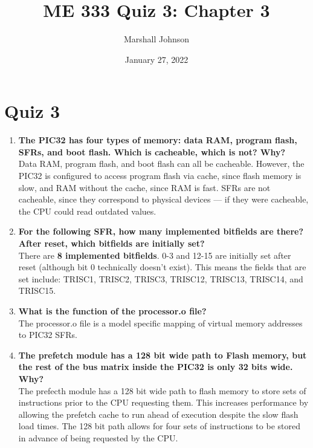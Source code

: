 \documentclass{article}
\title{ME 333 Quiz 3: Chapter 3}
\author{Marshall Johnson}
\date{January 27, 2022}
\begin{document}
\maketitle

\section*{Quiz 3}

\begin{enumerate}[label=\textbf{\arabic*})]
    \item \textbf{The PIC32 has four types of memory: data RAM, program flash, SFRs, and boot flash. Which 
    is cacheable, which is not? Why?} \\

    Data RAM, program flash, and boot flash can all be cacheable. However, the PIC32 is configured to access 
    program flash via cache, since flash memory is slow, and RAM without the cache, since RAM is fast.
    SFRs are not cacheable, since they correspond to physical devices --- if they were cacheable, the
    CPU could read outdated values.

    \item \textbf{For the following SFR, how many implemented bitfields are there? After reset, which bitfields 
    are initially set?} \\

    There are \textbf{8 implemented bitfields}. 0-3 and 12-15 are initially set after reset (although bit 0
    technically doesn't exist). This means the fields that are set include: TRISC1, TRISC2, TRISC3, TRISC12,
    TRISC13, TRISC14, and TRISC15.

    \item \textbf{What is the function of the processor.o file?} \\
    
    The processor.o file is a model specific mapping of virtual memory addresses to PIC32 SFRs.
    
    \item \textbf{The prefetch module has a 128 bit wide path to Flash memory, but the rest of the bus matrix 
    inside the PIC32 is only 32 bits wide. Why?} \\

    The prefecth module has a 128 bit wide path to flash memory to store sets of instructions prior to the CPU
    requesting them. This increases performance by allowing the prefetch cache to run ahead of execution
    despite the slow flash load times. The 128 bit path allows for four sets of instructions to be stored 
    in advance of being requested by the CPU.


\end{enumerate}
\end{document}
